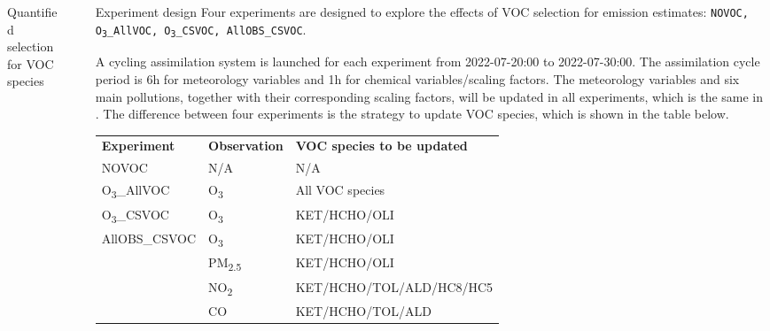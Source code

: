 \documentclass[final]{beamer}
\newlength{\sepwidth}
\newlength{\colwidth}
\newlength{\sepparagraph}
\newcommand{\separatorcolumn}{\begin{column}{\sepwidth}\end{column}}
\newcommand{\sepnewparagraph}{\vspace{\sepparagraph}}
\begin{document}
\begin{frame}[t]
\begin{columns}[t]
\begin{column}{\colwidth}
\begin{block}{Quantified selection for VOC species}
			\end{block}

		\end{column}
	
		\separatorcolumn
		
		\begin{column}{\colwidth}
			
			\begin{block}{Experiment design}
               Four experiments are designed to explore the effects of VOC selection for emission estimates: \texttt{NOVOC, O\textsubscript{3}\_AllVOC, O\textsubscript{3}\_CSVOC, AllOBS\_CSVOC}. \\
               
               \sepnewparagraph
               
               A cycling assimilation system is launched for each experiment from 2022-07-20:00 to 2022-07-30:00. The assimilation cycle period is 6h for meteorology variables and 1h for chemical variables/scaling factors. The meteorology variables and six main pollutions, together with their corresponding scaling factors, will be updated in all experiments, which is the same in \parencite{Peng_2020}. The difference between four experiments is the strategy to update VOC species, which is shown in the table below. \\

                \begin{table}[t]

                    \begin{center}
                    \begin{tabular}{l@{\hskip 2\sepwidth}l@{\hskip 2\sepwidth}l}
                    \hline
                    \hline
                    \vspace{0.5em}
                    \textbf{Experiment} & \textbf{Observation} & \textbf{VOC species to be updated} \\
                    \vspace{0.5em}
                    NOVOC & N/A & N/A \\
                    \vspace{0.5em}
                    O\textsubscript{3}\_AllVOC & O\textsubscript{3} & All VOC species \\
                    \vspace{0.5em}
                    O\textsubscript{3}\_CSVOC & O\textsubscript{3} & KET/HCHO/OLI \\
                    AllOBS\_CSVOC & O\textsubscript{3} & KET/HCHO/OLI \\
                     & PM\textsubscript{2.5} & KET/HCHO/OLI \\
                     & NO\textsubscript{2} & KET/HCHO/TOL/ALD/HC8/HC5 \\
                     & CO & KET/HCHO/TOL/ALD \\
                    \hline
                    \end{tabular}
                    

\end{center}
\end{table}
\end{block}
\end{column}
\end{columns}
\end{frame}
\end{document}
